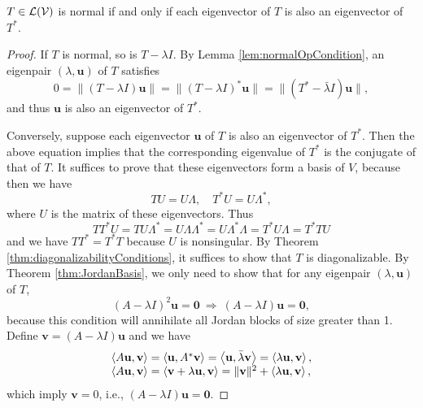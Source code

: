 \begin{lem}
  \label{lem:normalOpEigenVecCondition}
  $T\in {\cal L}({\cal V})$
  is normal if and only if
  each eigenvector of $T$
  is also an eigenvector of $T^*$.
\end{lem}
\begin{proof}
  If $T$ is normal, so is $T-\lambda I$.
  By Lemma \ref{lem:normalOpCondition},
  an eigenpair $(\lambda, \mathbf{u})$ of $T$ satisfies
  \begin{displaymath}
    0=\|(T-\lambda I)\mathbf{u}\|
    =\|(T-\lambda I)^*\mathbf{u}\|
    =\|(T^* - \bar{\lambda} I)\mathbf{u}\|,
  \end{displaymath}
  and thus $\mathbf{u}$ is also an eigenvector of $T^*$.

  Conversely, suppose each eigenvector $\mathbf{u}$ of $T$
  is also an eigenvector of $T^*$.
  Then the above equation implies that the corresponding eigenvalue of
  $T^*$ is the conjugate of that of $T$.
  It suffices to prove that these eigenvectors form a basis of $V$,
  because then we have
  \begin{displaymath}
    T U = U \Lambda,\quad T^* U = U \Lambda^*,
  \end{displaymath}
  where $U$ is the matrix of these eigenvectors.
  Thus
  \begin{displaymath}
    TT^*U = TU\Lambda^* = U\Lambda\Lambda^* = U\Lambda^*\Lambda =
    T^*U\Lambda = T^*TU
  \end{displaymath}
  and we have $TT^*=T^* T$ because $U$ is nonsingular.
  By Theorem \ref{thm:diagonalizabilityConditions},
  it suffices to show that $T$ is diagonalizable.
  By Theorem \ref{thm:JordanBasis},
  we only need to show that
  for any eigenpair $(\lambda, \mathbf{u})$ of $T$, 
  \begin{displaymath}
    (A-\lambda I)^2\mathbf{u}=\mathbf{0}\
    \Rightarrow\ (A-\lambda I)\mathbf{u}=\mathbf{0},
  \end{displaymath}
  because this condition will annihilate
  all Jordan blocks of size greater than 1.
  Define $\mathbf{v}= (A-\lambda I)\mathbf{u}$
  and we have
  \begin{displaymath}
    \begin{array}{l}
      \left\langle A\mathbf{u},\mathbf{v} \right\rangle= \left\langle \mathbf{u}, A^*\mathbf{v} \right\rangle
      = \left\langle \mathbf{u}, \bar{\lambda}\mathbf{v} \right\rangle
      = \left\langle \lambda\mathbf{u}, \mathbf{v} \right\rangle,
      \\
      \left\langle A\mathbf{u}, \mathbf{v} \right\rangle
      = \left\langle \mathbf{v}+\lambda\mathbf{u}, \mathbf{v} \right\rangle
      = \|\mathbf{v}\|^2 + \left\langle \lambda\mathbf{u}, \mathbf{v} \right\rangle, 
    \end{array}
  \end{displaymath}
  which imply %
  $\mathbf{v}=0$, i.e., $(A-\lambda I)\mathbf{u}=\mathbf{0}$.
\end{proof}

